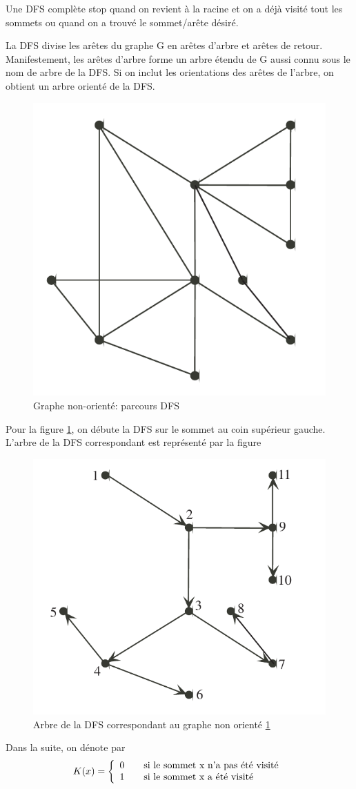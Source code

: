Une DFS complète stop quand on revient à la racine et on a déjà visité tout les sommets ou quand on a trouvé le sommet/arête désiré.

La DFS divise les arêtes du graphe G en arêtes d'arbre et arêtes de retour. Manifestement, les arêtes d'arbre forme un arbre étendu de G aussi connu sous le nom de arbre de la DFS. Si on inclut les orientations des arêtes de l'arbre, on obtient un arbre orienté de la DFS. 
\begin{figure}
\centering
\includegraphics[width=0.7\linewidth]{images/dfs-search-example}
\caption{Graphe non-orienté: parcours DFS}
\label{fig:dfs-search-example}
\end{figure}

Pour la figure \ref{fig:dfs-search-example}, on débute la DFS sur le sommet au coin supérieur gauche.
L'arbre de la DFS correspondant est représenté par la figure 
\begin{figure}
\centering
\includegraphics[width=0.7\linewidth]{images/dfs-tree-non-directed}
\caption{Arbre de la DFS correspondant au graphe non orienté \ref{fig:dfs-search-example}}
\label{fig:dfs-tree-non-directed}
\end{figure}


Dans la suite, on dénote par
\begin{equation*}
 K(x)=\left\{
 \begin{array}{l l}
 0 & \quad \text{si le sommet x n'a pas été visité}\\
 1 & \quad \text{si le sommet x a été visité}
 \end{array} \right.
\end{equation*}





 
 